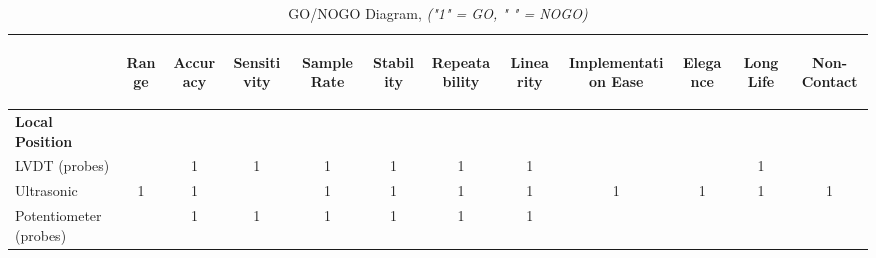 \documentclass[12pt]{article}
\begin{document}
\begin{table}[H]
  \centering
  \caption{GO/NOGO Diagram, \textit{("1" = GO, " " = NOGO)}}
    \begin{tabular}{p{15.645em}|c|c|c|c|c|c|c|c|c|c|c}
    \multicolumn{1}{r}{} & \multicolumn{1}{c}{\begin{sideways}\textbf{Range}\end{sideways}} & \multicolumn{1}{c}{\begin{sideways}\textbf{Accuracy}\end{sideways}} & \multicolumn{1}{c}{\begin{sideways}\textbf{Sensitivity}\end{sideways}} & \multicolumn{1}{c}{\begin{sideways}\textbf{Sample Rate}\end{sideways}} & \multicolumn{1}{c}{\begin{sideways}\textbf{Stability}\end{sideways}} & \multicolumn{1}{c}{\begin{sideways}\textbf{Repeatability}\end{sideways}} & \multicolumn{1}{c}{\begin{sideways}\textbf{Linearity}\end{sideways}} & \multicolumn{1}{c}{\begin{sideways}\textbf{Implementation Ease}\end{sideways}} & \multicolumn{1}{c}{\begin{sideways}\textbf{Elegance}\end{sideways}} & \multicolumn{1}{c}{\begin{sideways}\textbf{Long Life}\end{sideways}} & \begin{sideways}\textbf{Non-Contact}\end{sideways} \\
    \midrule
    \textbf{Local Position} &       &       &       &       &       &       &       &       &       &       &  \\
    LVDT (probes) &       & 1     & 1     & 1     & 1     & 1     & 1     &       &       & 1     &  \\
    Ultrasonic & 1     & 1     &       & 1     & 1     & 1     & 1     & 1     & 1     & 1     & 1 \\
    Potentiometer (probes) &       & 1     & 1     & 1     & 1     & 1     & 1     &       &       &       &  \\

\end{tabular}
\end{table}
\end{document}
